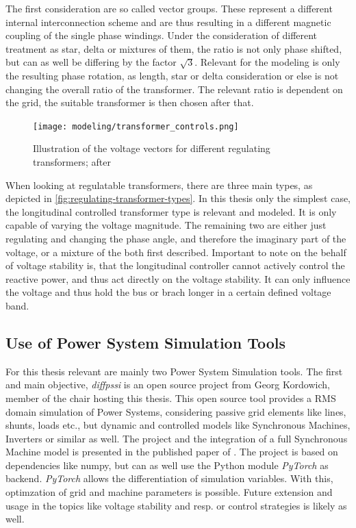 The first consideration are so called vector groups.
These represent a different internal interconnection scheme and are thus resulting in a different magnetic coupling of the single phase windings.
Under the consideration of different treatment as star, delta or mixtures of them, the ratio is not only phase shifted, but can as well be differing by the factor $\sqrt{3}$. 
Relevant for the modeling is only the resulting phase rotation, as length, star or delta consideration or else is not changing the overall ratio of the transformer.
The relevant ratio is dependent on the grid, the suitable transformer is then chosen after that.

\begin{figure}[htb!]
        \centering
        \texttt{[image: modeling/transformer\_controls.png]}
        \caption[Illustration of the voltage vectors for different regulating transformers]{Illustration of the voltage vectors for different regulating transformers; after \autocite{schwab_2022}}
        \label{fig:regulating-transformer-types}
\end{figure}

When looking at regulatable transformers, there are three main types, as depicted in \autoref{fig:regulating-transformer-types}.
In this thesis only the simplest case, the longitudinal controlled transformer type is relevant and modeled. 
It is only capable of varying the voltage magnitude.
The remaining two are either just regulating and changing the phase angle, and therefore the imaginary part of the voltage, or a mixture of the both first described.
Important to note on the behalf of voltage stability is, that the longitudinal controller cannot actively control the reactive power, and thus act directly on the voltage stability.
It can only influence the voltage and thus hold the bus or brach longer in a certain defined voltage band.

\subsection{Use of Power System Simulation Tools}
\label{sec:simulation-tools}

For this thesis relevant are mainly two Power System Simulation tools.
The first and main objective, \textit{diffpssi} is an open source project from Georg Kordowich, member of the chair hosting this thesis.
This open source tool provides a \acs{RMS} domain simulation of Power Systems, considering passive grid elements like lines, shunts, loads etc., but dynamic and controlled models like Synchronous Machines, Inverters or similar as well.
The project and the integration of a full Synchronous Machine model is presented in the published paper of \textcite{kordowich_2023}.
The project is based on dependencies like numpy, but can as well use the Python module \textit{PyTorch} as backend.
\textit{PyTorch} allows the differentiation of simulation variables.
With this, optimzation of grid and machine parameters is possible.
Future extension and usage in the topics like voltage stability and resp. or control strategies is likely as well.

